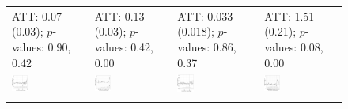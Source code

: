 \documentclass[12pt]{article}
\begin{document}
\begin{figure}[!th]
\begin{minipage}{1\linewidth}
{{\begin{tabular}{C{3.8cm}C{3.8cm}C{3.8cm}C{3.8cm}}
   \citet{Garfias2019jop} \newline  ATT: 0.07 (0.03); \newline $p$-values: 0.90, 0.42  &   
   \citet{Grumbach2020}\newline  ATT: 0.13 (0.03); \newline $p$-values: 0.42, 0.00 &
   \citet{Grumbach2022} \newline  ATT: 0.033 (0.018); \newline $p$-values: 0.86, 0.37  &
      \citet{hainmueller2019does} \newline  ATT: 1.51 (0.21); \newline $p$-values: 0.08, 0.00\\  
   \hspace{-2em}  \includegraphics[width = 0.22\textwidth]{figure/fect/garfias_fect_entry.png} &  
   \hspace{-2em}  \includegraphics[width = 0.22\textwidth]{figure/fect/Grumbach_fect_entry.png} &
   \hspace{-2em}  \includegraphics[width = 0.22\textwidth]{figure/fect/GH_fect_entry.png}  &
   \hspace{-2em}  \includegraphics[width = 0.22\textwidth]{figure/fect/Hainmueller_fect_entry.png}\\ \\
\end{tabular}}
}
\end{minipage}\vspace{-0.5em}
\addtocounter{figure}{-1}
\end{figure}
\end{document}
